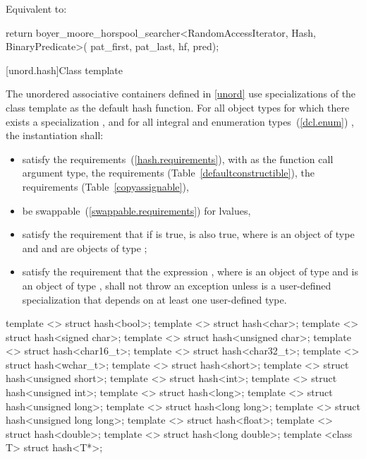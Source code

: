 \begin{itemdescr}

\pnum
\effects
Equivalent to:
\begin{codeblock}
return boyer_moore_horspool_searcher<RandomAccessIterator, Hash, BinaryPredicate>(
         pat_first, pat_last, hf, pred);
\end{codeblock}
\end{itemdescr}

[unord.hash]{Class template }

\pnum
{}%
%
The unordered associative containers defined in \ref{unord} use
specializations of the class template  as the default hash function.
For all object types  for which there exists a specialization ,
and for all integral and enumeration types~(\ref{dcl.enum}) ,
the instantiation  shall:

\begin{itemize}
\item satisfy the  requirements~(\ref{hash.requirements}),
with  as the function
call argument type, the  requirements (Table~\ref{defaultconstructible}),
the  requirements (Table~\ref{copyassignable}),
\item be swappable~(\ref{swappable.requirements}) for lvalues,
\item satisfy the requirement that if  is true,  is
also true, where  is an object of type  and  and 
are objects of type ;
\item satisfy the requirement that the expression , where 
is an object of type  and  is an object of type
, shall not throw an exception unless  is a
user-defined specialization that depends on at least one user-defined type.
\end{itemize}

%
\begin{itemdecl}
template <> struct hash<bool>;
template <> struct hash<char>;
template <> struct hash<signed char>;
template <> struct hash<unsigned char>;
template <> struct hash<char16_t>;
template <> struct hash<char32_t>;
template <> struct hash<wchar_t>;
template <> struct hash<short>;
template <> struct hash<unsigned short>;
template <> struct hash<int>;
template <> struct hash<unsigned int>;
template <> struct hash<long>;
template <> struct hash<unsigned long>;
template <> struct hash<long long>;
template <> struct hash<unsigned long long>;
template <> struct hash<float>;
template <> struct hash<double>;
template <> struct hash<long double>;
template <class T> struct hash<T*>;
\end{itemdecl}

